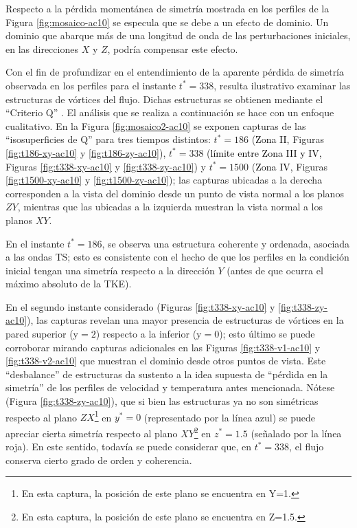 Respecto a la pérdida momentánea de simetría mostrada en los perfiles de la Figura \ref{fig:mosaico-ac10}  se especula que se debe a un efecto de dominio. Un dominio que abarque más de una longitud de onda de las perturbaciones iniciales, en las direcciones $X$ y $Z$, podría compensar este efecto.

Con el fin de profundizar en el entendimiento de la aparente pérdida de simetría observada en los perfiles para el instante $t^* = 338$, resulta ilustrativo examinar las estructuras de vórtices del flujo. Dichas estructuras se obtienen mediante el ``Criterio Q'' \cite{hunt1988eddies}. El análisis que se realiza a continuación se hace con un enfoque cualitativo. En la Figura \ref{fig:mosaico2-ac10} se exponen capturas de las ``isosuperficies de Q'' para tres tiempos distintos: $t^* = 186$ (\textcolor{black}{Zona II,} Figuras \ref{fig:t186-xy-ac10} y  \ref{fig:t186-zy-ac10}),  $t^* = 338$  (\textcolor{black}{límite entre Zona III y IV,} Figuras \ref{fig:t338-xy-ac10} y  \ref{fig:t338-zy-ac10}) y  $t^* = 1500$  (\textcolor{black}{Zona IV,} Figuras \ref{fig:t1500-xy-ac10} y  \ref{fig:t1500-zy-ac10}); las capturas ubicadas a la derecha corresponden a la vista del dominio desde un punto de vista normal a los planos $ZY$, mientras que las ubicadas a la izquierda muestran la vista normal a los planos $XY$.

En el instante $t^* = 186$, se observa una estructura coherente y ordenada, asociada a las ondas TS; esto es consistente con el hecho de que los perfiles en la condición inicial tengan una simetría respecto a la dirección $Y$ (antes de que ocurra el máximo absoluto de la TKE). 



En el segundo instante considerado (Figuras \ref{fig:t338-xy-ac10} y \ref{fig:t338-zy-ac10}), las capturas revelan una mayor presencia de estructuras de vórtices en la pared superior ($\text{y}=2$) respecto a la inferior ($\text{y}=0$); esto último se puede corroborar mirando capturas adicionales en las Figuras \ref{fig:t338-v1-ac10} y \ref{fig:t338-v2-ac10} que muestran el dominio desde otros puntos de vista. Este ``desbalance'' de estructuras da sustento a la idea supuesta de ``pérdida en la simetría'' de los perfiles de velocidad y temperatura antes mencionada. Nótese (Figura \ref{fig:t338-zy-ac10}), que si bien las estructuras ya no son simétricas respecto al plano $ZX$\footnote{En esta captura, la posición de este plano se encuentra en Y=1.} en $y^*=0$ (representado por la línea azul) se puede apreciar cierta simetría respecto al plano $XY$\footnote{En esta captura, la posición de este plano se encuentra en Z=1.5.} en $z^*= 1 \text{.} 5$ (señalado por la línea roja). En este sentido, todavía se puede considerar que, en $t^* = 338$, el flujo conserva cierto grado de orden y coherencia. 


